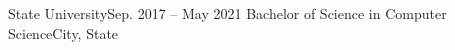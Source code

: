 \resumeSubHeadingListStart
    \resumeSubheading
    {State University}{Sep. 2017 -- May 2021}
    {Bachelor of Science in Computer Science}{City, State}
\resumeSubHeadingListEnd

